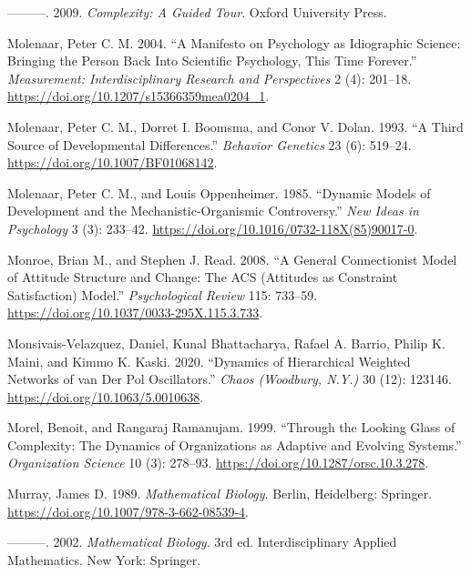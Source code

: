 \documentclass[
  a4paper,
  DIV=11,
  numbers=noendperiod,
  oneside]{scrreprt}
\newlength{\cslhangindent}
\newenvironment{CSLReferences}[2] %
 {\begin{list}{}{%
  \setlength{\itemindent}{0pt}
  \setlength{\leftmargin}{0pt}
  \setlength{\parsep}{0pt}
  \ifodd #1
   \setlength{\leftmargin}{\cslhangindent}
   \setlength{\itemindent}{-1\cslhangindent}
  \fi
  \setlength{\itemsep}{#2\baselineskip}}}
 {\end{list}}
\begin{document}
\begin{CSLReferences}{1}{0}
---------. 2009. \emph{Complexity: {A Guided Tour}}. {Oxford University
Press}.

Molenaar, Peter C. M. 2004. {``A {Manifesto} on {Psychology} as
{Idiographic Science}: {Bringing} the {Person Back Into Scientific
Psychology}, {This Time Forever}.''} \emph{Measurement:
Interdisciplinary Research and Perspectives} 2 (4): 201--18.
\url{https://doi.org/10.1207/s15366359mea0204_1}.

Molenaar, Peter C. M., Dorret I. Boomsma, and Conor V. Dolan. 1993. {``A
Third Source of Developmental Differences.''} \emph{Behavior Genetics}
23 (6): 519--24. \url{https://doi.org/10.1007/BF01068142}.

Molenaar, Peter C. M., and Louis Oppenheimer. 1985. {``Dynamic Models of
Development and the Mechanistic-Organismic Controversy.''} \emph{New
Ideas in Psychology} 3 (3): 233--42.
\url{https://doi.org/10.1016/0732-118X(85)90017-0}.

Monroe, Brian M., and Stephen J. Read. 2008. {``A General Connectionist
Model of Attitude Structure and Change: {The ACS} ({Attitudes} as
{Constraint Satisfaction}) Model.''} \emph{Psychological Review} 115:
733--59. \url{https://doi.org/10.1037/0033-295X.115.3.733}.

Monsivais-Velazquez, Daniel, Kunal Bhattacharya, Rafael A. Barrio,
Philip K. Maini, and Kimmo K. Kaski. 2020. {``Dynamics of Hierarchical
Weighted Networks of van Der {Pol} Oscillators.''} \emph{Chaos
(Woodbury, N.Y.)} 30 (12): 123146.
\url{https://doi.org/10.1063/5.0010638}.

Morel, Benoit, and Rangaraj Ramanujam. 1999. {``Through the {Looking
Glass} of {Complexity}: {The Dynamics} of {Organizations} as {Adaptive}
and {Evolving Systems}.''} \emph{Organization Science} 10 (3): 278--93.
\url{https://doi.org/10.1287/orsc.10.3.278}.

Murray, James D. 1989. \emph{Mathematical Biology}. Berlin, Heidelberg:
Springer. \url{https://doi.org/10.1007/978-3-662-08539-4}.

---------. 2002. \emph{Mathematical Biology}. 3rd ed. Interdisciplinary
Applied Mathematics. {New York}: {Springer}.


\end{CSLReferences}
\end{document}
